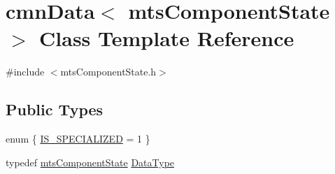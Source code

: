 \hypertarget{classcmn_data_3_01mts_component_state_01_4}{\section{cmn\-Data$<$ mts\-Component\-State $>$ Class Template Reference}
\label{classcmn_data_3_01mts_component_state_01_4}
}


{\ttfamily \#include $<$mts\-Component\-State.\-h$>$}

\subsection*{Public Types}
\begin{DoxyCompactItemize}
\item 
enum \{ \hyperlink{classcmn_data_3_01mts_component_state_01_4_a11e79b0fc64762ffbb8003615449c9e4a7a0d2bba6c288f9c1bc16447bb9933f3}{I\-S\-\_\-\-S\-P\-E\-C\-I\-A\-L\-I\-Z\-E\-D} = 1
 \}
\item 
typedef \hyperlink{classmts_component_state}{mts\-Component\-State} \hyperlink{classcmn_data_3_01mts_component_state_01_4_a1f90216f34afbed70f7dbd34d33fafde}{Data\-Type}
\end{DoxyCompactItemize}
